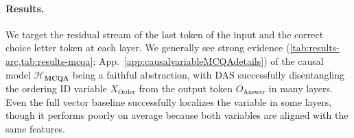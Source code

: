 \documentclass{article}
\theoremstyle{plain}
\theoremstyle{definition}
\theoremstyle{remark}
\newcommand{\order}{X_{\text{Order}}}
\newcommand{\answer}{O_{\text{Answer}}}
\begin{document}
\paragraph{Results.} We target the residual stream of the last token of the input and the correct choice letter token at each layer. We generally see strong evidence (\cref{tab:results-arc,tab:results-mcqa}; App.~\ref{app:causalvariableMCQAdetails}) of the causal model $\mathcal{H}_{\mathbf{MCQA}}$ being a faithful abstraction, with DAS successfully disentangling the ordering ID variable $\order$ from the output token $\answer$ in many layers. Even the full vector baseline successfully localizes the variable in some layers, though it performs poorly on average because both variables are aligned with the same features. 

\end{document}
